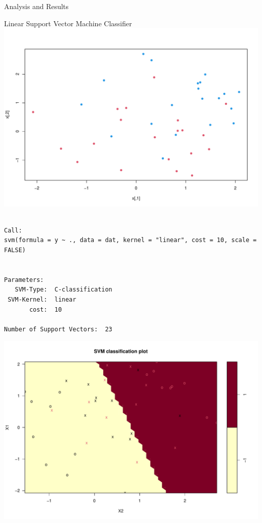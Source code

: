 \documentclass[
  ignorenonframetext,
]{beamer}
\begin{document}
\begin{frame}[fragile]{Analysis and Results}
\protect\hypertarget{analysis-and-results}{}
\begin{block}{Linear Support Vector Machine Classifier}
\protect\hypertarget{linear-support-vector-machine-classifier}{}
\includegraphics{slides_files/figure-beamer/unnamed-chunk-1-1.pdf}

\begin{verbatim}

Call:
svm(formula = y ~ ., data = dat, kernel = "linear", cost = 10, scale = FALSE)


Parameters:
   SVM-Type:  C-classification 
 SVM-Kernel:  linear 
       cost:  10 

Number of Support Vectors:  23
\end{verbatim}

\includegraphics{slides_files/figure-beamer/unnamed-chunk-1-2.pdf}


\end{block}
\end{frame}
\end{document}
